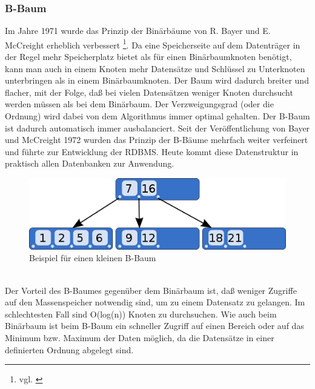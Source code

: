\subsubsection{B-Baum}
Im Jahre 1971 wurde das Prinzip der Binärbäume von R. Bayer und E. McCreight erheblich verbessert  \footnote{vgl. \cite{Bayer1972}}.
Da eine Speicherseite auf dem Datenträger in der Regel mehr Speicherplatz bietet als für einen Binärbaumknoten benötigt, kann man auch in einem Knoten mehr Datensätze und Schlüssel zu Unterknoten unterbringen als in einem Binärbaumknoten. Der Baum wird dadurch breiter und flacher, mit der Folge, daß bei vielen Datensätzen weniger Knoten durchsucht werden müssen als bei dem Binärbaum. Der Verzweigungsgrad (oder die Ordnung) wird dabei von dem Algorithmus immer optimal gehalten. Der B-Baum ist dadurch automatisch immer ausbalanciert. Seit der Veröffentlichung von Bayer und McCreight 1972 wurden das Prinzip der B-Bäume mehrfach weiter verfeinert und führte zur Entwicklung der RDBMS. Heute kommt diese Datenstruktur in praktisch allen Datenbanken zur Anwendung.\\
\begin{figure}[h]
\includegraphics[width=.75\textwidth]{img/B-tree.png}
\caption[Beispiel für einen kleinen B-Baum]{Beispiel für einen kleinen B-Baum \footnotemark}
\label{bbaum}
\end{figure}
\\Der Vorteil des B-Baumes gegenüber dem Binärbaum ist, daß weniger Zugriffe auf den Massenspeicher notwendig sind, um zu einem Datensatz zu gelangen. Im schlechtesten Fall sind O(log(n)) Knoten zu durchsuchen. Wie auch beim Binärbaum ist beim B-Baum ein schneller Zugriff auf einen Bereich oder auf das Minimum bzw. Maximum der Daten möglich, da die Datensätze in einer definierten Ordnung abgelegt sind.

